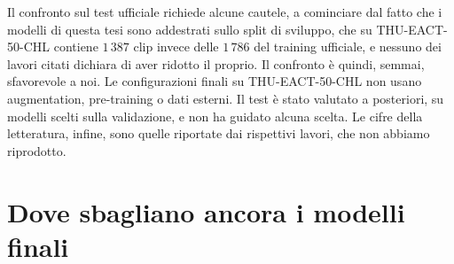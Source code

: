 Il confronto sul test ufficiale richiede alcune cautele, a cominciare dal fatto che i modelli di questa tesi sono addestrati sullo split di sviluppo, che su THU-EACT-50-CHL contiene $1\,387$ clip invece delle $1\,786$ del training ufficiale, e nessuno dei lavori citati dichiara di aver ridotto il proprio. Il confronto è quindi, semmai, sfavorevole a noi. Le configurazioni finali su THU-EACT-50-CHL non usano augmentation, pre-training o dati esterni. Il test è stato valutato a posteriori, su modelli scelti sulla validazione, e non ha guidato alcuna scelta. Le cifre della letteratura, infine, sono quelle riportate dai rispettivi lavori, che non abbiamo riprodotto.



\section{Dove sbagliano ancora i modelli finali}
\label{sec:errori}


